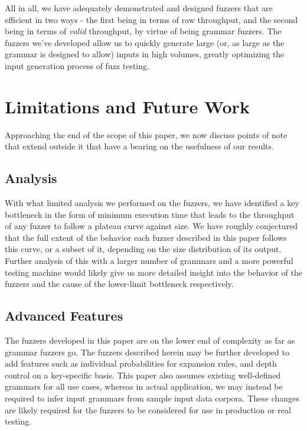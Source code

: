 \documentclass[8pt, twoside]{extarticle}
\begin{document}
All in all, we have adequately demonstrated and designed fuzzers that are efficient in two ways - the first being in terms of raw throughput, and the second being in terms of \textit{valid} throughput, by virtue of being grammar fuzzers. The fuzzers we've developed allow us to quickly generate large (or, as large as the grammar is designed to allow) inputs in high volumes, greatly optimizing the input generation process of fuzz testing.

\section{Limitations and Future Work}

Approaching the end of the scope of this paper, we now discuss points of note that extend outside it that have a bearing on the usefulness of our results.

\subsection{Analysis}

With what limited analysis we performed on the fuzzers, we have identified a key bottleneck in the form of minimum execution time that leads to the throughput of any fuzzer to follow a plateau curve against size. We have roughly conjectured that the full extent of the behavior each fuzzer described in this paper follows this curve, or a subset of it, depending on the size distribution of its output. Further analysis of this with a larger number of grammars and a more powerful testing machine would likely give us more detailed insight into the behavior of the fuzzers and the cause of the lower-limit bottleneck respectively.

\subsection{Advanced Features}

The fuzzers developed in this paper are on the lower end of complexity as far as grammar fuzzers go. The fuzzers described herein may be further developed to add features such as individual probabilities for expansion rules, and depth control on a key-specific basis. This paper also assumes existing well-defined grammars for all use cases, whereas in actual application, we may instead be required to infer input grammars from sample input data corpora. These changes are likely required for the fuzzers to be considered for use in production or real testing.
\end{document}
